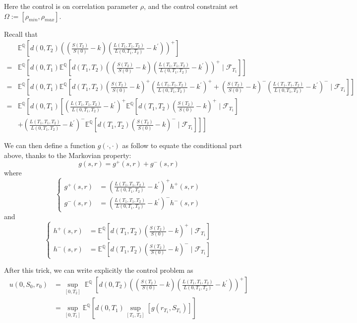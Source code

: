 \documentclass[11pt]{article}
\numberwithin{equation}{section}
\DeclareMathOperator*{\E}{\mathbb{E}}
\theoremstyle{remark}
\begin{document}
Here the control is on correlation parameter $\rho$, and the control constraint set $\Omega := [\rho_{min}, \rho_{max}]$.

Recall that
$$
\begin{array}{ll}
& \mathbb{E}^\mathbb{Q}\left[d(0,T_2)\left(\left(\frac{S(T_2)}{S(0)}-k\right)\left(\frac{L(T_1,T_1,T_2)}{L(0,T_1,T_2)}-k^\prime\right)\right)^+   \right] \\
=& \mathbb{E}^\mathbb{Q}\left[d(0,T_1) \mathbb{E}^\mathbb{Q}\left[d(T_1,T_2)\left(\left(\frac{S(T_2)}{S(0)}-k\right)\left(\frac{L(T_1,T_1,T_2)}{L(0,T_1,T_2)}-k^\prime\right)\right)^+\mid\mathcal{F}_{T_1}   \right]   \right]\\
=&  \mathbb{E}^\mathbb{Q}\left[d(0,T_1) \mathbb{E}^\mathbb{Q}\left[d(T_1,T_2)\left(\frac{S(T_2)}{S(0)}-k\right)^+\left(\frac{L(T_1,T_1,T_2)}{L(0,T_1,T_2)}-k^\prime\right)^+ + \left(\frac{S(T_2)}{S(0)}-k\right)^-\left(\frac{L(T_1,T_1,T_2)}{L(0,T_1,T_2)}-k^\prime\right)^- \mid\mathcal{F}_{T_1}  \right]   \right]\\
=&  \mathbb{E}^\mathbb{Q}\left[d(0,T_1) \left[\left(\frac{L(T_1,T_1,T_2)}{L(0,T_1,T_2)}-k^\prime\right)^+\mathbb{E}^\mathbb{Q}\left[d(T_1,T_2)\left(\frac{S(T_2)}{S(0)}-k\right)^+\mid\mathcal{F}_{T_1}\right] \right.\right.\\
&+ \left.\left.\left(\frac{L(T_1,T_1,T_2)}{L(0,T_1,T_2)}-k^\prime\right)^-\mathbb{E}^\mathbb{Q} \left[d(T_1,T_2)\left(\frac{S(T_2)}{S(0)}-k\right)^-\mid\mathcal{F}_{T_1}\right] \right]\right]
\end{array}
$$

We can then define a function $g(\cdot, \cdot)$ as follow to equate the conditional part above, thanks to the Markovian property:
$$g(s, r) = g^+(s, r) + g^-(s, r)$$
where
$$
\left\{
\begin{array}{ll}
g^+(s, r) & =  \left(\frac{L(T_1,T_1,T_2)}{L(0,T_1,T_2)}-k^\prime\right)^+ h^+(s, r)\\
g^-(s, r) & = \left(\frac{L(T_1,T_1,T_2)}{L(0,T_1,T_2)}-k^\prime\right)^- h^-(s, r)
\end{array}
\right.
$$
and
$$
\left\{
\begin{array}{ll}
h^+(s, r) & =  \mathbb{E}^\mathbb{Q} \left[d(T_1,T_2) \left(\frac{S(T_2)}{S(0)}-k\right)^+ \mid \mathcal{F}_{T_1} \right]\\
h^-(s, r) & = \mathbb{E}^\mathbb{Q} \left[d(T_1,T_2)\left(\frac{S(T_2)}{S(0)}-k\right)^-\mid\mathcal{F}_{T_1}\right]
\end{array}
\right.
$$

After this trick, we can write explicitly the control problem as
$$
\begin{array}{ll}
u(0, S_0, r_0) & = \sup_{[0,T_2]} {\E} ^\mathbb{Q} \left[ d(0,T_2)\left(\left(\frac{S(T_2)}{S(0)} - k\right) \left(\frac{L(T_1,T_1,T_2)}{L(0,T_1,T_2)} - k^\prime\right) \right)^+ \right]\\
& =  \sup_{[0,T_1]} \mathbb{E}^\mathbb{Q}\left[d(0,T_1) \sup_{[T_1,T_2]} \left[g(r_{T_1},S_{T_1}) \right]\right]
\end{array}
$$
\end{document}
